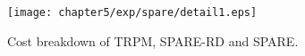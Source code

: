 
\begin{figure}
\centering
\texttt{[image: chapter5/exp/spare/detail1.eps]}
 \caption{Cost breakdown of TRPM, SPARE-RD and SPARE.}
    \label{exp:wl}
\end{figure}







